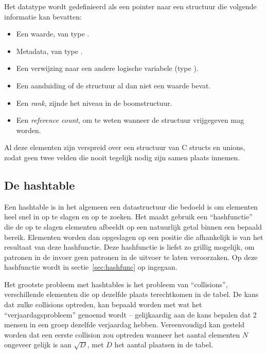 Het datatype  wordt gedefinieerd als een pointer naar een structuur die volgende informatie kan bevatten: \begin{itemize}
  \item Een waarde, van type .
  \item Metadata, van type .
  \item Een verwijzing naar een andere logische variabele (type ).
  \item Een aanduiding of de structuur al dan niet een waarde bevat.
  \item Een {\em rank}, zijnde het niveau in de boomstructuur.
  \item Een {\em reference count}, om te weten wanneer de structuur vrijgegeven mag worden.
\end{itemize}
Al deze elementen zijn verspreid over een structuur van C structs en unions, zodat geen twee velden die nooit tegelijk nodig zijn samen plaats innemen.

\subsection{De hashtable} \label{sec:hashtable}

Een hashtable is in het algemeen een datastructuur die bedoeld is om elementen heel snel in op te slagen en op te zoeken. Het maakt gebruik een ``hashfunctie'' die de op te slagen elementen afbeeldt op een natuurlijk getal binnen een bepaald bereik. Elementen worden dan opgeslagen op een positie die afhankelijk is van het resultaat van deze hashfunctie. Deze hashfunctie is liefst zo grillig mogelijk, om patronen in de invoer geen patronen in de uitvoer te laten veroorzaken. Op deze hashfunctie wordt in sectie~\ref{sec:hashfunc} op ingegaan.

Het grootste probleem met hashtables is het probleem van ``collisions'', verschillende elementen die op dezelfde plaats terechtkomen in de tabel. De kans dat zulke collisions optreden, kan bepaald worden met wat het ``verjaardagsprobleem'' genoemd wordt -- gelijkaardig aan de kans bepalen dat 2 mensen in een groep dezelfde verjaardag hebben. Vereenvoudigd kan gesteld worden dat een eerste collision zou optreden wanneer het aantal elementen $N$ ongeveer gelijk is aan $\sqrt{D}$, met $D$ het aantal plaatsen in de tabel.

